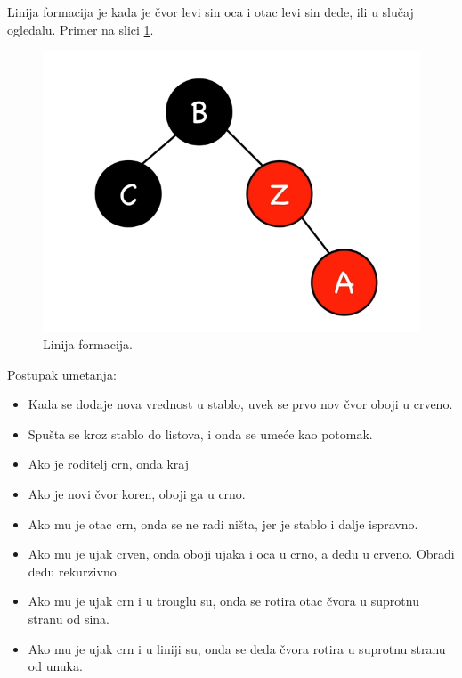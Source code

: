 \documentclass[a4paper]{article}
\begin{document}
    Linija formacija je kada je čvor levi sin oca i otac levi sin dede, ili u slučaj ogledalu.
    Primer na slici \ref{fig:line}.
    \begin{figure}[h!]
        \begin{center}
        \includegraphics[scale=0.5]{line.png}
        \end{center}
        \caption{Linija formacija.}
        \label{fig:line}
        \end{figure}

    Postupak umetanja:
    \begin{itemize}

    \item Kada se dodaje nova vrednost u stablo, uvek se prvo nov čvor oboji u crveno.
    \item Spušta se kroz stablo do listova, i onda se umeće kao potomak.

    \item Ako je roditelj crn, onda kraj

   \item Ako je novi čvor koren, oboji ga u crno.
   \item Ako mu je otac crn, onda se ne radi ništa, jer je stablo i dalje ispravno.
   \item Ako mu je ujak crven, onda oboji ujaka i oca u crno, a dedu u crveno. Obradi dedu rekurzivno.
   \item Ako mu je ujak crn i u trouglu su, onda se rotira otac čvora u suprotnu stranu od sina.
   \item Ako mu je ujak crn i u liniji su, onda se deda čvora rotira u suprotnu stranu od unuka.
\end{itemize}
\end{document}
